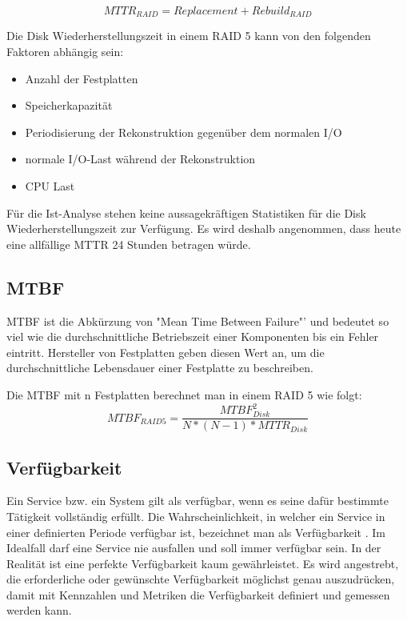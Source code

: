\begin{equation}
MTTR_{RAID}=Replacement+Rebuild_{RAID}
\label{eqn:MTBF-RAID 5}
\end{equation}

Die Disk Wiederherstellungszeit in einem RAID 5 kann von den folgenden Faktoren abhängig sein:
\begin{itemize}
\item Anzahl der Festplatten
\item Speicherkapazität
\item Periodisierung der Rekonstruktion gegenüber dem normalen I/O
\item  normale I/O-Last während der Rekonstruktion
\item  CPU Last
\end{itemize}

Für die Ist-Analyse stehen keine aussagekräftigen Statistiken für die Disk Wiederherstellungszeit zur Verfügung. Es wird deshalb angenommen, dass heute eine allfällige MTTR 24 Stunden betragen würde.


\subsection{MTBF}
MTBF ist die Abkürzung von "Mean Time Between Failure"' und bedeutet so viel wie die durchschnittliche Betriebszeit einer Komponenten bis ein Fehler eintritt. Hersteller von Festplatten geben diesen Wert an, um die durchschnittliche Lebensdauer einer Festplatte zu beschreiben. 

Die MTBF mit n Festplatten berechnet man in einem RAID 5 \cite{Chen1994} wie folgt:
\begin{equation}
MTBF_{RAID 5}=\frac{MTBF_{Disk}^2}{N*(N-1)*MTTR_{Disk}}
\label{eqn:MTBF-RAID 5}
\end{equation}

\subsection{Verfügbarkeit}
Ein Service bzw. ein System gilt als verfügbar, wenn es seine dafür bestimmte Tätigkeit vollständig erfüllt. Die Wahrscheinlichkeit, in welcher ein Service in einer definierten Periode verfügbar ist, bezeichnet man als Verfügbarkeit \cite{Held2004}. Im Idealfall darf eine Service nie ausfallen und soll immer verfügbar sein. In der Realität ist eine perfekte Verfügbarkeit kaum gewährleistet. Es wird angestrebt, die erforderliche oder gewünschte Verfügbarkeit möglichst genau auszudrücken, damit mit Kennzahlen und Metriken die Verfügbarkeit definiert und gemessen werden kann. 

